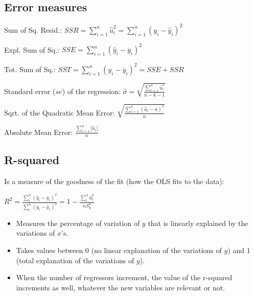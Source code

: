\documentclass[10pt, a4paper, landscape]{extarticle}
\begin{document}
\begin{multicols}{3}

\subsection*{Error measures}

Sum of Sq. Resid.: $SSR = \sum_{i=1}^n \hat{u}_i^2 = \sum_{i=1}^n (y_i - \hat{y}_i)^2$

Expl. Sum of Sq.: $SSE = \sum_{i=1}^n (\hat{y}_i - \overline{y}_i)^2$

Tot. Sum of Sq.: $SST = \sum_{i=1}^n (y_i - \overline{y}_i)^2 = SSE + SSR$

Standard error ($se$) of the regression: $\hat{\sigma} = \sqrt{\frac{\sum_{i=1}^n \hat{u}_i^2}{n-k-1}}$

Sqrt. of the Quadratic Mean Error: $\sqrt{\frac{\sum_{i=1}^n (\hat{u}_i - \overline{u})^2}{n}}$

Absolute Mean Error: $\frac{\sum_{i=1}^n |\hat{u}_i|}{n}$

\columnbreak

\subsection*{R-squared}

Is a measure of the goodness of the fit (how the OLS fits to the data):

$R^2 = \frac{\sum_i^n (\hat{y}_i - \overline{y}_i)^2}{\sum_i^n (y_i - \overline{y}_i)^2} = 1 - \frac{\sum_i^n \hat{u}_i^2}{nS_y^2}$

\begin{itemize}[leftmargin=*]
\item Measures the percentage of variation of $y$ that is linearly explained by the variations of $x$'s.
\item Takes values between 0 (no linear explanation of the variations of $y$) and 1 (total explanation of the variations of $y$).
\item When the number of regressors increment, the value of the r-squared increments as well, whatever the new variables are relevant or not.
\end{itemize}


\end{multicols}
\end{document}
